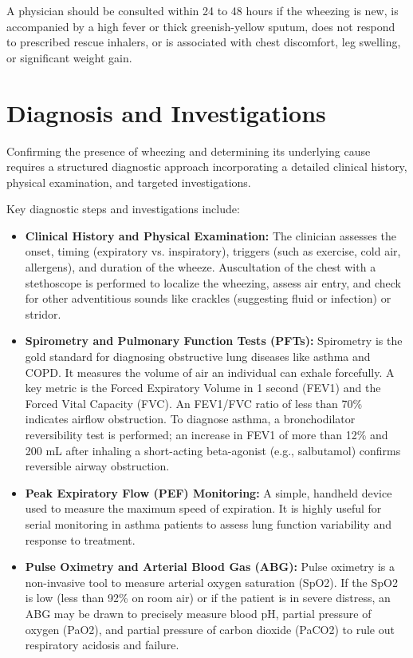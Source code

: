 A physician should be consulted within 24 to 48 hours if the wheezing is new, is accompanied by a high fever or thick greenish-yellow sputum, does not respond to prescribed rescue inhalers, or is associated with chest discomfort, leg swelling, or significant weight gain.

\section*{Diagnosis and Investigations}
Confirming the presence of wheezing and determining its underlying cause requires a structured diagnostic approach incorporating a detailed clinical history, physical examination, and targeted investigations.

Key diagnostic steps and investigations include:
\begin{itemize}
    \item \textbf{Clinical History and Physical Examination:} The clinician assesses the onset, timing (expiratory vs. inspiratory), triggers (such as exercise, cold air, allergens), and duration of the wheeze. Auscultation of the chest with a stethoscope is performed to localize the wheezing, assess air entry, and check for other adventitious sounds like crackles (suggesting fluid or infection) or stridor.
    \item \textbf{Spirometry and Pulmonary Function Tests (PFTs):} Spirometry is the gold standard for diagnosing obstructive lung diseases like asthma and COPD. It measures the volume of air an individual can exhale forcefully. A key metric is the Forced Expiratory Volume in 1 second (FEV1) and the Forced Vital Capacity (FVC). An FEV1/FVC ratio of less than 70\% indicates airflow obstruction. To diagnose asthma, a bronchodilator reversibility test is performed; an increase in FEV1 of more than 12\% and 200 mL after inhaling a short-acting beta-agonist (e.g., salbutamol) confirms reversible airway obstruction.
    \item \textbf{Peak Expiratory Flow (PEF) Monitoring:} A simple, handheld device used to measure the maximum speed of expiration. It is highly useful for serial monitoring in asthma patients to assess lung function variability and response to treatment.
    \item \textbf{Pulse Oximetry and Arterial Blood Gas (ABG):} Pulse oximetry is a non-invasive tool to measure arterial oxygen saturation (SpO2). If the SpO2 is low (less than 92\% on room air) or if the patient is in severe distress, an ABG may be drawn to precisely measure blood pH, partial pressure of oxygen (PaO2), and partial pressure of carbon dioxide (PaCO2) to rule out respiratory acidosis and failure.

\end{itemize}
